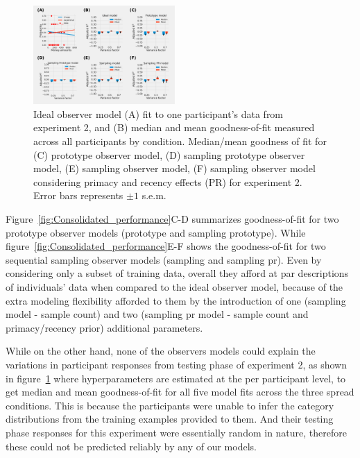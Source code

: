 \documentclass[10pt,letterpaper]{article}
\begin{document}
\begin{figure}[h!]
    \centering
    \includegraphics[width=0.48\textwidth]{results/Consolidated_performance_CS.pdf}
    \caption{Ideal observer model (A) fit to one participant's data from experiment 2, and (B) median and mean goodness-of-fit measured across all participants by condition. Median/mean goodness of fit for (C) prototype observer model, (D) sampling prototype observer model, (E) sampling observer model, (F) sampling observer model considering primacy and recency effects (PR) for experiment 2. Error bars represents $\pm 1$ s.e.m.} 
    \label{fig:Consolidated_performance2}
\end{figure}

Figure~\ref{fig:Consolidated_performance}C-D summarizes goodness-of-fit for two prototype observer models (prototype and sampling prototype). While figure~\ref{fig:Consolidated_performance}E-F shows the goodness-of-fit for two sequential sampling observer models (sampling and sampling pr). Even by considering only a subset of training data, overall they afford at par descriptions of individuals' data when compared to the ideal observer model, because of the extra modeling flexibility afforded to them by the introduction of one (sampling model - sample count) and two (sampling pr model - sample count and primacy/recency prior) additional parameters. 

While on the other hand, none of the observers models could explain the variations in participant responses from testing phase of experiment 2, as shown in figure~\ref{fig:Consolidated_performance2} where hyperparameters are estimated at the per participant level, to get median and mean goodness-of-fit for all five model fits across the three spread conditions. This is because the participants were unable to infer the category distributions from the training examples provided to them. And their testing phase responses for this experiment were essentially random in nature, therefore these could not be predicted reliably by any of our models.  
\end{document}
